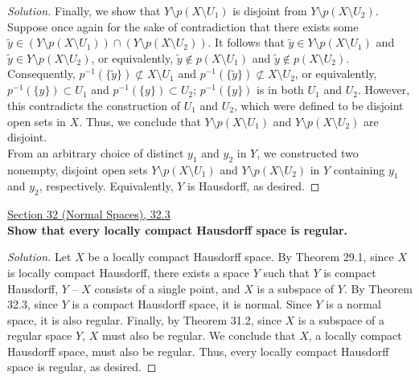 \documentclass[11pt]{article}
\newenvironment{solution}
  {\renewcommand\qedsymbol{$\blacksquare$}\begin{proof}[Solution]}
  {\end{proof}}
\begin{document}
\begin{enumerate}[a)]
\begin{solution}
        Finally, we show that $Y \setminus p(X \setminus U_1)$ is disjoint from $Y \setminus p(X \setminus U_2)$.
        Suppose once again for the sake of contradiction that there exists some $\tilde{y} \in (Y \setminus p(X \setminus U_1)) \cap (Y\setminus p(X \setminus U_2))$. It follows that $\tilde{y} \in Y \setminus p(X \setminus U_1)$ and $\tilde{y} \in Y \setminus p(X \setminus U_2)$, or equivalently,
        $\tilde{y} \notin p(X \setminus U_1)$ and $\tilde{y} \notin p(X \setminus U_2)$. Consequently, $p^{-1}(\{ \tilde{y} \}) \not\subset X \setminus U_1$ and $p^{-1}(\{ \tilde{y} \}) \not\subset X \setminus U_2$, or equivalently, 
        $p^{-1}(\{y\}) \subset U_1$ and $p^{-1}(\{y\}) \subset U_2$; $p^{-1}(\{ y \})$ is in both $U_1$ and $U_2$. However, this contradicts the construction of $U_1$ and $U_2$, which were defined to be disjoint open sets in $X$. Thus, we conclude that
        $Y \setminus p(X \setminus U_1)$ and $Y \setminus p(X \setminus U_2)$ are disjoint. \\

        From an arbitrary choice of distinct $y_1$ and $y_2$ in $Y$, we constructed two nonempty, disjoint open sets  $Y \setminus p(X \setminus U_1)$ and $Y \setminus p(X \setminus U_2)$ in $Y$ containing $y_1$ and $y_2$, respectively. Equivalently, $Y$ is Hausdorff, as desired.
    \end{solution}
\end{enumerate}

\newpage

\underline{Section 32 (Normal Spaces), 32.3} \\

\textbf{Show that every locally compact Hausdorff space is regular.}

\begin{solution}
Let $X$ be a locally compact Hausdorff space. By Theorem 29.1, since $X$ is locally compact Hausdorff, there exists a space $Y$ such that
$Y$ is compact Hausdorff, $Y \text{ -- } X$ consists of a single point, and $X$ is a subspace of $Y$. By Theorem 32.3, since $Y$ is a compact Hausdorff space, it is normal. 
Since $Y$ is a normal space, it is also regular. Finally, by Theorem 31.2, since $X$ is a subspace of a regular space $Y$, $X$ must also be regular. 
We conclude that $X$, a locally compact Hausdorff space, must also be regular. Thus, every locally compact Hausdorff space is regular, as desired.
\end{solution}

\newpage
\end{document}
